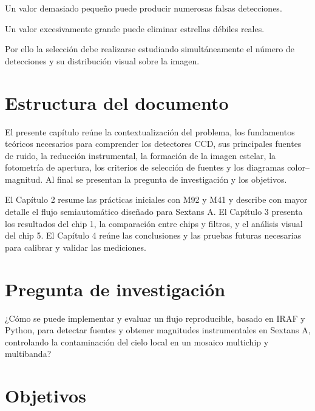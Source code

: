 \documentclass[12pt,letterpaper,oneside]{book}
\begin{document}
Un valor demasiado pequeño puede producir numerosas falsas detecciones.

Un valor excesivamente grande puede eliminar estrellas débiles reales.

Por ello la selección debe realizarse estudiando simultáneamente el número de detecciones y su distribución visual sobre la imagen.





\section{Estructura del documento}

El presente capítulo reúne la contextualización del problema, los fundamentos teóricos necesarios para comprender los detectores CCD, sus principales fuentes de ruido, la reducción instrumental, la formación de la imagen estelar, la fotometría de apertura, los criterios de selección de fuentes y los diagramas color--magnitud. Al final se presentan la pregunta de investigación y los objetivos.

El Capítulo 2 resume las prácticas iniciales con M92 y M41 y describe con mayor detalle el flujo semiautomático diseñado para Sextans A. El Capítulo 3 presenta los resultados del chip 1, la comparación entre chips y filtros, y el análisis visual del chip 5. El Capítulo 4 reúne las conclusiones y las pruebas futuras necesarias para calibrar y validar las mediciones.

\section{Pregunta de investigación}

¿Cómo se puede implementar y evaluar un flujo reproducible, basado en IRAF y Python, para detectar fuentes y obtener magnitudes instrumentales en Sextans A, controlando la contaminación del cielo local en un mosaico multichip y multibanda?


\section{Objetivos}
\end{document}
